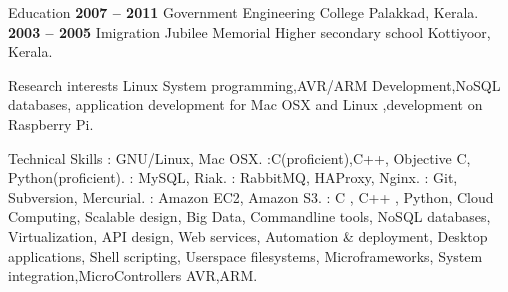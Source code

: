 \documentclass{resume}
\author{Tony Lijo Jose}
\begin{document}
\maketitle


\begin{category}{Education}
   \hfill \textbf{2007 -- 2011}
  \citemnobullet Government Engineering College Palakkad, Kerala.
   \hfill \textbf{2003 -- 2005}
  \citemnobullet Imigration Jubilee Memorial Higher secondary school Kottiyoor, Kerala.
\end{category}


\begin{category}{Research interests}
  \citemnobullet Linux System programming,AVR/ARM Development,NoSQL databases, application development for Mac OSX and Linux ,development on Raspberry Pi.
\end{category}

\begin{category}{Technical Skills}
  : GNU/Linux, Mac OSX.
  :C(proficient),C++, Objective C, Python(proficient).
  : MySQL, Riak.
  :  RabbitMQ, HAProxy, Nginx.
  : Git, Subversion, Mercurial.
  :  Amazon EC2, Amazon S3.
  : C , C++ , Python, Cloud Computing, Scalable design, Big Data, Commandline 
  tools, NoSQL databases, Virtualization, API design, Web services, Automation \& deployment, 
  Desktop applications, Shell scripting, Userspace filesystems, Microframeworks, System integration,MicroControllers AVR,ARM.
\end{category}

\end{document}
